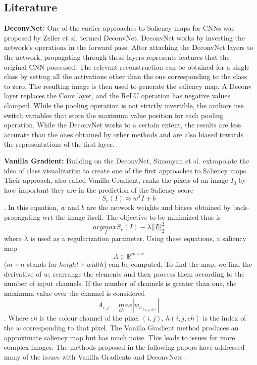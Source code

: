 \subsection{Literature}
\textbf{DeconvNet: }
One of the earlier approaches to Saliency maps for CNNs was proposed by Zeiler et al. \cite{zeilerVisualizingUnderstandingConvolutional2013} termed DeconvNet. DeconvNet works by inverting the network's operations in the forward pass. After attaching the DeconvNet layers to the network, propagating through these layers represents features that the original CNN possessed. The relevant reconstruction can be obtained for a single class by setting all the activations other than the one corresponding to the class to zero. The resulting image is then used to generate the saliency map. A Deconv layer replaces the Conv layer, and the ReLU operation has negative values clamped. While the pooling operation is not strictly invertible, the authors use switch variables that store the maximum value position for each pooling operation. While the DeconvNet works to a certain extent, the results are less accurate than the ones obtained by other methods and are also biased towards the representations of the first layer.

\textbf{Vanilla Gradient: }
Building on the DeconvNet, Simonyan et al. \cite{simonyanDeepConvolutionalNetworks2014} extrapolate the idea of class visualization to create one of the first approaches to Saliency maps. Their approach, also called Vanilla Gradient, ranks the pixels of an image $I_{0}$ by how important they are in the prediction of the Saliency score $$S_{c}(I) \approx w^{T}I + b$$. In this equation, $w$ and $b$ are the network weights and biases obtained by back-propagating wrt the image itself. The objective to be minimized thus is $$arg \underset{I}max S_{c}(I) - \lambda||I||^{2}_{2}$$ where $\lambda$ is used as a regularization parameter. Using these equations, a saliency map $$A \in \mathbb{R}^{m \times n}$$ ($m \times n$ stands for $height \times width$) can be computed. To find the map, we find the derivative of $w$, rearrange the elements and then process them according to the number of input channels. If the number of channels is greater than one, the maximum value over the channel is considered $$A_{i,j}= \underset{ch}max |w_{h_{(i,j, ch)}}|$$. Where $ch$ is the colour channel of the pixel $(i,j)$, $h(i,j, ch)$ is the index of the $w$ corresponding to that pixel. The Vanilla Gradient method produces an approximate saliency map but has much noise. This leads to issues for more complex images. The methods proposed in the following papers have addressed many of the issues with Vanilla Gradients and DeconvNets \cite{zeilerVisualizingUnderstandingConvolutional2013}.

